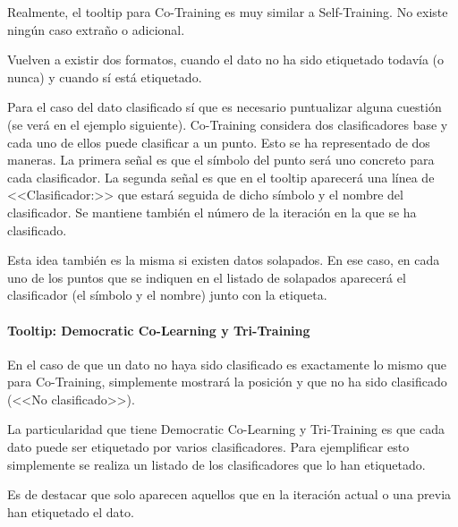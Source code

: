 Realmente, el tooltip para Co-Training es muy similar a Self-Training. No existe
ningún caso extraño o adicional.

Vuelven a existir dos formatos, cuando el dato no ha sido etiquetado todavía (o
nunca) y cuando sí está etiquetado. 


Para el caso del dato clasificado sí que es necesario puntualizar alguna
cuestión (se verá en el ejemplo siguiente). Co-Training considera dos
clasificadores base y cada uno de ellos puede clasificar a un punto. Esto se ha
representado de dos maneras. La primera señal es que el símbolo del punto será
uno concreto para cada clasificador. La segunda señal es que en el tooltip
aparecerá una línea de <<Clasificador:>> que estará seguida de dicho símbolo y
el nombre del clasificador. Se mantiene también el número de la iteración en la
que se ha clasificado.


Esta idea también es la misma si existen datos solapados. En ese caso, en cada
uno de los puntos que se indiquen en el listado de solapados aparecerá el
clasificador (el símbolo y el nombre) junto con la etiqueta.


\paragraph{Tooltip: Democratic Co-Learning y Tri-Training}

En el caso de que un dato no haya sido clasificado es exactamente lo mismo que
para Co-Training, simplemente mostrará la posición y que no ha sido clasificado
(<<No clasificado>>).

La particularidad que tiene Democratic Co-Learning y Tri-Training es que cada
dato puede ser etiquetado por varios clasificadores. Para ejemplificar esto
simplemente se realiza un listado de los clasificadores que lo han etiquetado.


Es de destacar que solo aparecen aquellos que en la iteración actual o una
previa han etiquetado el dato.

